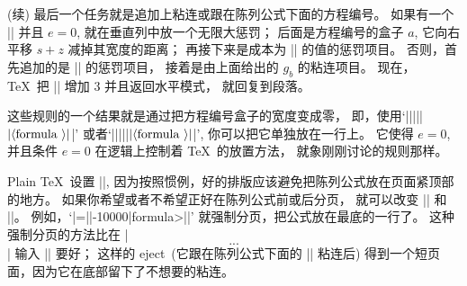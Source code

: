 \ddanger (续) 最后一个任务就是追加上粘连或跟在陈列公式下面的方程编号。%
如果有一个 |\eqno| 并且 $e=0$, 就在垂直列中放一个无限大惩罚；
后面是方程编号的盒子 $a$, 它向右平移 $s+z$ 减掉其宽度的距离；
再接下来是成本为 |\postdisplaypenalty| 的值的惩罚项目。%
否则，首先追加的是 |\postdisplaypenalty| 的惩罚项目，
接着是由上面给出的 $g_b$ 的粘连项目。%
现在， \TeX\ 把 |\prevgraf| 增加 3 并且返回水平模式，
就回复到段落。

\ddanger 这些规则的一个结果就是通过把方程编号盒子的宽度变成零，
即，使用`|\eqno||\llap||{$|\<formula>|$}|'%
或者`|\leqno||\rlap||{$|\<formula>|$}|', 你可以把它单独放在一行上。%
它使得 $e=0$, 并且条件 $e=0$ 在逻辑上控制着 \TeX\ 的放置方法，
就象刚刚讨论的规则那样。

\ddanger Plain \TeX\ 设置 ||,
因为按照惯例，好的排版应该避免把陈列公式放在页面紧顶部的地方。%
如果你希望或者不希望正好在陈列公式前或后分页，
就可以改变 |\predisplaypenalty| 和 |\postdisplaypenalty|。%
例如，`\hbox{|$$\postdisplaypenalty=|}\allowbreak\hbox{|-10000|\<formula>|$$|}'
就强制分页，把公式放在最底的一行了。%
这种强制分页的方法比在 |$$...$$| 输入 |\eject| 要好；
这样的 eject~(它跟在陈列公式下面的 |\belowdisplayskip| 粘连后)%
得到一个短页面，因为它在底部留下了不想要的粘连。

